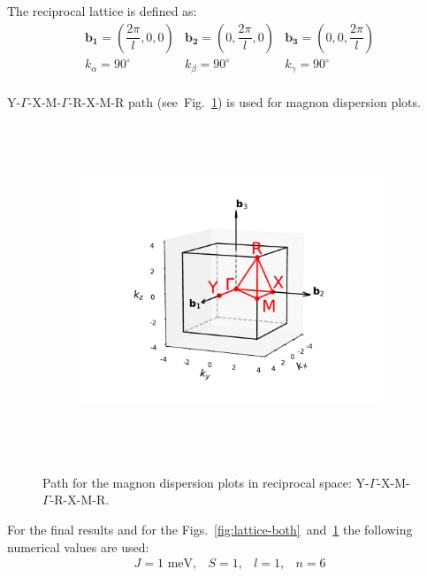 \documentclass[a4paper,12pt]{article}
\begin{document}
        The reciprocal lattice is defined as:
        \begin{equation}
            \begin{matrix}
                \mathbf{b_1} = (\dfrac{2\pi}{l}, 0, 0) & \mathbf{b_2} = (0,\dfrac{2\pi}{l}, 0) & \mathbf{b_3} = (0, 0, \dfrac{2\pi}{l}) \\
                k_{\alpha} = 90^{\circ} & k_{\beta} = 90^{\circ} & k_{\gamma} = 90^{\circ} \\
            \end{matrix}
        \end{equation}

        Y-$\Gamma$-X-M-$\Gamma$-R-X-M-R path (see~Fig.~\ref{fig:path}) is used for magnon dispersion plots.

        \begin{figure}[H]
            \centering
            \begin{subfigure}[b]{0.8\textwidth}
                \centering
                \includegraphics[height=10cm]{path.pdf}
            \end{subfigure}
            \hfill
            \caption{Path for the magnon dispersion plots in reciprocal space: Y-$\Gamma$-X-M-$\Gamma$-R-X-M-R.}
            \label{fig:path}
        \end{figure}


        For the final results and for the Figs.~\ref{fig:lattice-both}~and~\ref{fig:path} the following numerical values are used:
        \begin{equation}
            \begin{matrix}
                J = 1 \text{ meV}, & S = 1, & l = 1, & n = 6
            \end{matrix}
        \end{equation}
\end{document}

